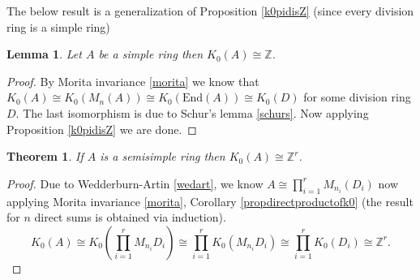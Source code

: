 \documentclass[12pt]{report}
\numberwithin{equation}{section}
\newcommand{\Z}{\mathbb{Z}}
\newcounter{dummy} \numberwithin{dummy}{section}
\newtheorem{theorem}[dummy]{Theorem}
\newtheorem{lemma}[dummy]{Lemma}
\begin{document}
	The below result is a generalization of Proposition \ref{k0pidisZ} (since every division ring is a simple ring)
	\begin{lemma}
		Let $A$ be a simple ring then $K_0(A) \cong \Z $.
	\end{lemma}
	\begin{proof}
		By Morita invariance \ref{morita} we know that $K_0(A) \cong K_0(M_n(A)) \cong K_0(\mathrm{End}(A)) \cong K_0(D)$ for some division ring $D$. The last isomorphism is due to Schur's lemma \ref{schurs}. Now applying Proposition \ref{k0pidisZ} we are done.
	\end{proof}
	\begin{theorem}
		If $A$ is a semisimple ring then $K_0(A)\cong \Z^r$.
	\end{theorem}
	\begin{proof}
		Due to Wedderburn-Artin \ref{wedart}, we know $A \cong \prod_{i=1}^r M_{n_i} (D_i)$ now applying Morita invariance \ref{morita}, Corollary \ref{propdirectproductofk0} (the result for $n$ direct sums is obtained via induction).
		 $$K_0(A) \cong K_0\left(\prod_{i=1}^r M_{n_i} D_i\right) \cong \prod_{i=1}^r K_0\left( M_{n_i}D_i\right) \cong \prod_{i=1}^r K_0(D_i) \cong \Z^r.$$
	\end{proof}
	
\end{document}
